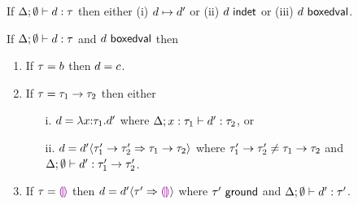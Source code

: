 \begin{thm}[Progress]
  If $\Delta; \emptyset \vdash d : \tau$ then either
  (i) $d \mapsto d'$ or
  (ii) $d~\mathsf{indet}$ or
  (iii) $d~\mathsf{boxedval}$.
\end{thm}

\begin{thm}
  If $\Delta; \emptyset \vdash d : \tau$ and $d~\mathsf{boxedval}$
  then
  \begin{enumerate}[label=(\alph*)]
    \item If $\tau=b$ then $d=c$.
    \item If $\tau=\tau_1 \rightarrow \tau_2$ then either
      \begin{enumerate}
        \item[i.]
          $d=\lambda x{:}\tau_1.d'$
          where $\Delta; x : \tau_1 \vdash d' : \tau_2$, or
        \item[ii.]
          $d=d' \langle{\tau_1' \rightarrow \tau_2'}\Rightarrow{\tau_1 \rightarrow \tau_2}\rangle$
          where $\tau_1' \rightarrow \tau_2'\neq\tau_1 \rightarrow \tau_2$
          and $\Delta; \emptyset \vdash d' : \tau_1' \rightarrow \tau_2'$.
      \end{enumerate}
    \item If $\tau=\textcolor{violet}{\llparenthesis}\textcolor{violet}{\rrparenthesis}$
          then $d=d' \langle{\tau'}\Rightarrow{\textcolor{violet}{\llparenthesis}\textcolor{violet}{\rrparenthesis}}\rangle$
          where $\tau'~\mathsf{ground}$
          and $\Delta; \emptyset \vdash d' : \tau'$.
  \end{enumerate}
\end{thm}

